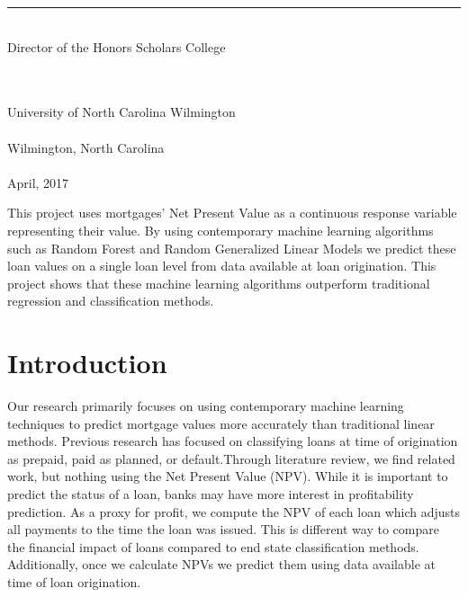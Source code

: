 \documentclass[12 pt]{uncw_thesis}
\theoremstyle{plain}
\theoremstyle{remark}
\theoremstyle{definition}
\begin{document}
\begin{singlespace}
    \rule{7.5cm}{.01in}\\
     Director of the Honors Scholars College \\
\begin{center}   
    \hskip 1pt \\
    \hskip 1pt \\    %
    University of North Carolina Wilmington\\
    \hskip 1pt \\    %
    Wilmington, North Carolina \\
    \hskip 1pt \\    %
    April, 2017\\
\end{center}
\end{singlespace}
\newpage

%
%

\newpage
\pagestyle{plain}
\begin{center}
\tableofcontents
\end{center}


%
%

 This project uses mortgages' Net Present Value as a  continuous response variable representing their value. By using contemporary machine learning algorithms such as Random Forest and Random Generalized Linear Models we predict these loan values on a single loan level from data available at loan origination. This project shows that these machine learning algorithms outperform traditional regression and classification methods.

\newpage
{}
\section{Introduction}
\thispagestyle{plain}
Our research primarily focuses on using contemporary machine learning techniques to  predict mortgage values more accurately than traditional linear methods. Previous research has focused on classifying loans at time of origination as prepaid, paid as planned, or default\cite{Deng}.Through literature review, we find related work, but nothing using the Net Present Value (NPV). While it is important to predict the status of a loan, banks may have more interest in profitability prediction. As a proxy for profit, we compute the NPV of each loan which adjusts all payments to the time the loan was issued. This is different way to compare the financial impact of loans compared to end state classification methods. Additionally, once we calculate NPVs we predict them using data available at time of loan origination. 
\end{document}
